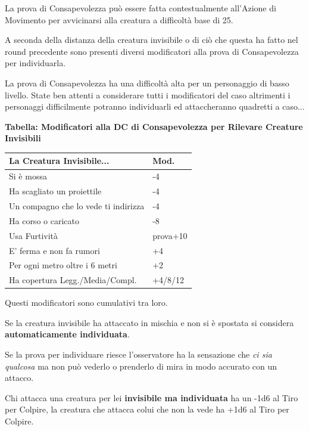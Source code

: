 \begin{multicols}{2}
La prova di Consapevolezza può essere fatta contestualmente all'Azione di Movimento per avvicinarsi alla creatura a difficoltà base di 25.

A seconda della distanza della creatura invisibile o di ciò che questa ha fatto nel round precedente sono presenti diversi modificatori alla prova di Consapevolezza per individuarla.

\medskip

\begin{narratore}[Invisibilità]
La prova di Consapevolezza ha una difficoltà alta per un personaggio di basso livello. State ben attenti a considerare tutti i modificatori del caso altrimenti i personaggi difficilmente potranno individuarli ed attaccheranno quadretti a caso...
\end{narratore}

\bigskip

\textbf{Tabella: Modificatori alla DC di Consapevolezza per Rilevare Creature Invisibili}

\medskip

\noindent\begin{tabularx}{0.48\textwidth}{Xl}
	\toprule
\textbf{La Creatura Invisibile...} & \textbf{Mod.}\\
\toprule
Si è mossa& -4\\
Ha scagliato un proiettile & -4\\
Un compagno che lo vede ti indirizza & -4\\
Ha corso o caricato& -8\\
Usa Furtività & prova+10\\
E' ferma e non fa rumori & +4\\
Per ogni metro oltre i 6 metri & +2\\
Ha copertura Legg./Media/Compl. & +4/8/12
\end{tabularx}

\medskip

Questi modificatori sono cumulativi tra loro.

Se la creatura invisibile ha attaccato in mischia e non si è spostata si considera \textbf{automaticamente individuata}.

Se la prova per individuare riesce l'osservatore ha la sensazione che \emph{ci sia qualcosa} ma non può vederlo o prenderlo di mira in modo accurato con un attacco.

Chi attacca una creatura per lei \textbf{invisibile ma individuata} ha un -1d6 al Tiro per Colpire, la creatura che attacca colui che non la vede ha +1d6 al Tiro per Colpire.


\end{multicols}
